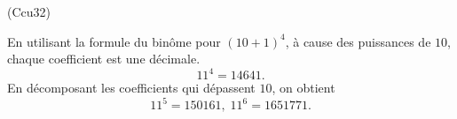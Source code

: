 \begin{tiny}(Ccu32)\end{tiny} En utilisant la formule du binôme pour $(10 + 1)^4$, à cause des puissances de $10$, chaque coefficient est une décimale.
\[
  11^4 = 14641.
\]
En décomposant les coefficients qui dépassent $10$, on obtient
\[
  11^5 = 150161, \; 11^6 = 1651771.
\]
